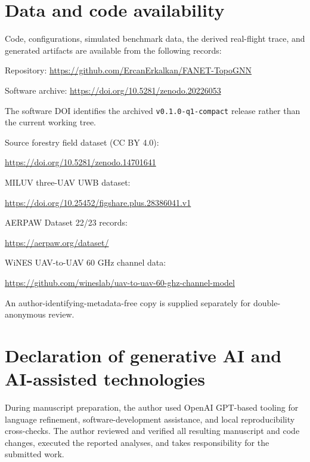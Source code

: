 \documentclass[preprint,12pt]{elsarticle}
\begin{document}
\section*{Data and code availability}
{\small Code, configurations, simulated benchmark data, the derived real-flight trace, and generated artifacts are available from the following records:\par
Repository: \url{https://github.com/ErcanErkalkan/FANET-TopoGNN}\par
Software archive: \url{https://doi.org/10.5281/zenodo.20226053}\par
The software DOI identifies the archived \texttt{v0.1.0-q1-compact} release rather than the current working tree.\par
Source forestry field dataset (CC BY 4.0):\par
\url{https://doi.org/10.5281/zenodo.14701641}\par
MILUV three-UAV UWB dataset:\par
\url{https://doi.org/10.25452/figshare.plus.28386041.v1}\par
AERPAW Dataset 22/23 records:\par
\url{https://aerpaw.org/dataset/}\par
WiNES UAV-to-UAV 60 GHz channel data:\par
\url{https://github.com/wineslab/uav-to-uav-60-ghz-channel-model}\par
An author-identifying-metadata-free copy is supplied separately for double-anonymous review.}

\section*{Declaration of generative AI and AI-assisted technologies}
During manuscript preparation, the author used OpenAI GPT-based tooling for language refinement, software-development assistance, and local reproducibility cross-checks. The author reviewed and verified all resulting manuscript and code changes, executed the reported analyses, and takes responsibility for the submitted work.
\end{document}
